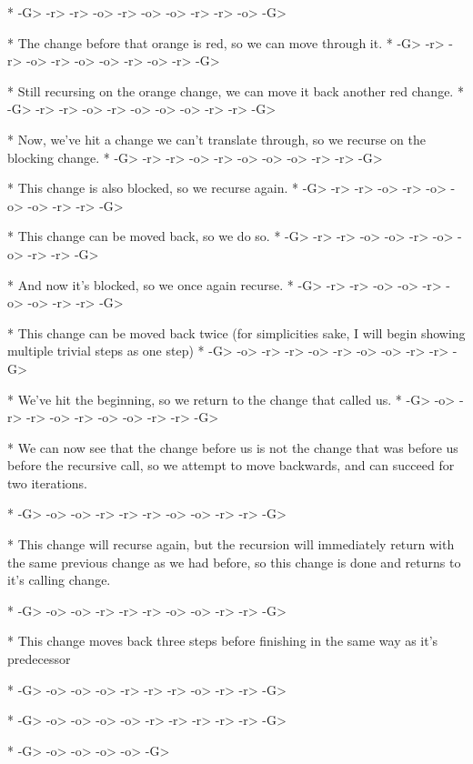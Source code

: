 \documentclass{article}
\begin{document}
      	   	     	     	     *
-G> -r> -r> -o> -r> -o> -o> -r> -r> -o> -G>


* The change before that orange is red, 
so we can move through it.
      	     	    	 	 *
-G> -r> -r> -o> -r> -o> -o> -r> -o> -r> -G>

* Still recursing on the orange change, 
we can move it back another red change.
  		     	     *
-G> -r> -r> -o> -r> -o> -o> -o> -r> -r> -G>

* Now, we've hit a change we can't translate through, 
so we recurse on the blocking change.
       	     	   	 *
-G> -r> -r> -o> -r> -o> -o> -o> -r> -r> -G>

* This change is also blocked, 
so we recurse again.
       	      	     *
-G> -r> -r> -o> -r> -o> -o> -o> -r> -r> -G>

* This change can be moved back, 
so we do so.
       	      	 *
-G> -r> -r> -o> -o> -r> -o> -o> -r> -r> -G>

* And now it's blocked, 
so we once again recurse.
      	     *
-G> -r> -r> -o> -o> -r> -o> -o> -r> -r> -G>

* This change can be moved back twice 
(for simplicities sake, 
I will begin showing multiple trivial steps as one step)
     *
-G> -o> -r> -r> -o> -r> -o> -o> -r> -r> -G>

* We've hit the beginning, 
so we return to the change that called us.
  	    	 *
-G> -o> -r> -r> -o> -r> -o> -o> -r> -r> -G>

* We can now see that the change before us 
is not the change that was before us 
before the recursive call, 
so we attempt to move backwards, 
and can succeed for two iterations.

     	 *
-G> -o> -o> -r> -r> -r> -o> -o> -r> -r> -G>


* This change will recurse again, 
but the recursion will immediately return 
with the same previous change 
as we had before, 
so this change is done 
and returns to it's calling change.

       	      	   	 *
-G> -o> -o> -r> -r> -r> -o> -o> -r> -r> -G>


* This change moves back three steps 
before finishing in the same way as it's predecessor

       	      	    	     *
-G> -o> -o> -o> -r> -r> -r> -o> -r> -r> -G>

    	    	    	    	    	 *
-G> -o> -o> -o> -o> -r> -r> -r> -r> -r> -G>

    	    	     *
-G> -o> -o> -o> -o> -G>
\end{document}
